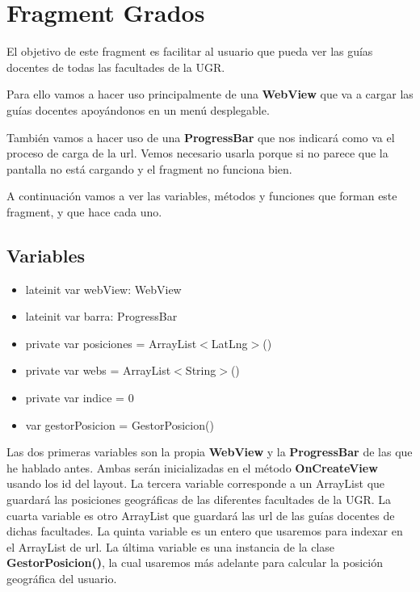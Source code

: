\documentclass[a4paper,11pt]{article}
\begin{document}
\section{Fragment Grados}

\vspace{5 mm}

El objetivo de este fragment es facilitar al usuario que pueda ver las guías docentes de todas las facultades de la UGR.

Para ello vamos a hacer uso principalmente de una \textbf{WebView} que va a cargar las guías docentes apoyándonos en un menú desplegable. 

\vspace{5 mm}

También vamos a hacer uso de una \textbf{ProgressBar} que nos indicará como va el proceso de carga de la url. Vemos necesario usarla porque si no parece que la pantalla no está cargando y el fragment no funciona bien.

\vspace{5 mm}

A continuación vamos a ver las variables, métodos y funciones que forman este fragment, y que hace cada uno. 

\vspace{5 mm}

\subsection{Variables}

\vspace{5 mm}

\begin{itemize}

\item{lateinit var webView: WebView}
\item{lateinit var barra: ProgressBar}
\item{private var posiciones = ArrayList$<$LatLng$>$()}
\item{private var webs = ArrayList$<$String$>$()}
\item{private var indice = 0}
\item{var gestorPosicion = GestorPosicion()}

\end{itemize}

Las dos primeras variables son la propia \textbf{WebView} y la \textbf{ProgressBar} de las que he hablado antes. Ambas serán inicializadas en el método \textbf{OnCreateView} usando los id del layout. 
La tercera variable corresponde a un ArrayList que guardará las posiciones geográficas de las diferentes facultades de la UGR. La cuarta variable es otro ArrayList que guardará las url de las guías docentes de dichas facultades. La quinta variable es un entero que usaremos para indexar en el ArrayList de url. La última variable es una instancia de la clase \textbf{GestorPosicion()}, la cual usaremos más adelante para calcular la posición geográfica del usuario. 
\end{document}
